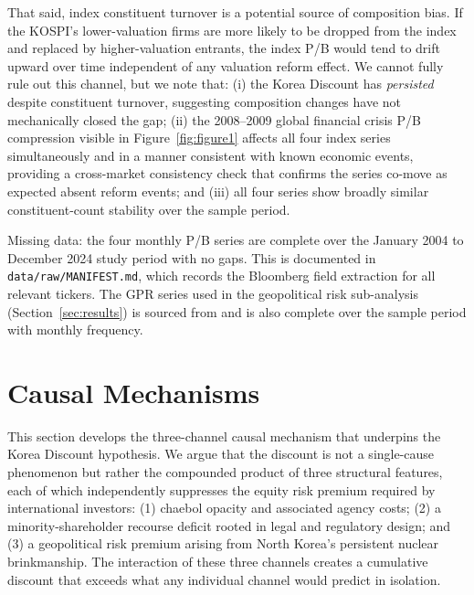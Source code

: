 \documentclass[12pt]{article}
\begin{document}
That said, index constituent turnover is a potential source of composition bias. If the
KOSPI's lower-valuation firms are more likely to be dropped from the index and replaced
by higher-valuation entrants, the index P/B would tend to drift upward over time
independent of any valuation reform effect. We cannot fully rule out this channel,
but we note that: (i) the Korea Discount has \textit{persisted} despite constituent
turnover, suggesting composition changes have not mechanically closed the gap; (ii) the
2008--2009 global financial crisis P/B compression visible in Figure~\ref{fig:figure1}
affects all four index series simultaneously and in a manner consistent with known
economic events, providing a cross-market consistency check that confirms the series
co-move as expected absent reform events; and (iii) all four series show broadly similar
constituent-count stability over the sample period.

Missing data: the four monthly P/B series are complete over the January 2004 to
December 2024 study period with no gaps. This is documented in \texttt{data/raw/MANIFEST.md},
which records the Bloomberg field extraction for all relevant tickers. The GPR series
used in the geopolitical risk sub-analysis (Section~\ref{sec:results}) is sourced from
\citet{caldara2022} and is also complete over the sample period with monthly frequency.




\section{Causal Mechanisms}
\label{sec:mechanisms}

This section develops the three-channel causal mechanism that underpins the Korea Discount
hypothesis. We argue that the discount is not a single-cause phenomenon but rather the
compounded product of three structural features, each of which independently suppresses the
equity risk premium required by international investors: (1) chaebol opacity and associated
agency costs; (2) a minority-shareholder recourse deficit rooted in legal and regulatory
design; and (3) a geopolitical risk premium arising from North Korea's persistent nuclear
brinkmanship. The interaction of these three channels creates a cumulative discount that
exceeds what any individual channel would predict in isolation.
\end{document}
